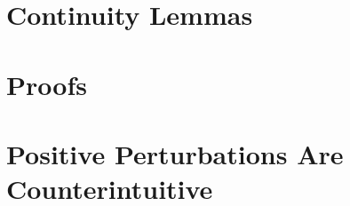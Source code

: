 \documentclass[11pt]{article}
\begin{document}




\clearpage
\newpage

\appendix
\section*{Continuity Lemmas}


\section*{Proofs}


\section*{Positive Perturbations Are Counterintuitive}\label{app:positive_pert}

\end{document}
